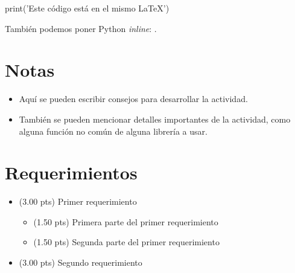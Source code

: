 \documentclass{iic2233activity}
\begin{document}
\begin{python}
print('Este código está en el mismo LaTeX')
\end{python}


También podemos poner Python \textit{inline}: .

\section*{Notas}

\begin{itemize}
	\item Aquí se pueden escribir consejos para desarrollar la actividad.
	\item También se pueden mencionar detalles importantes de la actividad, como alguna función no común de alguna librería a usar.
\end{itemize}

\section*{Requerimientos}
\begin{itemize}
	\item (3.00 pts) Primer requerimiento
	      \begin{itemize}
		      \item (1.50 pts) Primera parte del primer requerimiento
		      \item (1.50 pts) Segunda parte del primer requerimiento
	      \end{itemize}
	\item (3.00 pts) Segundo requerimiento
\end{itemize}
\end{document}
